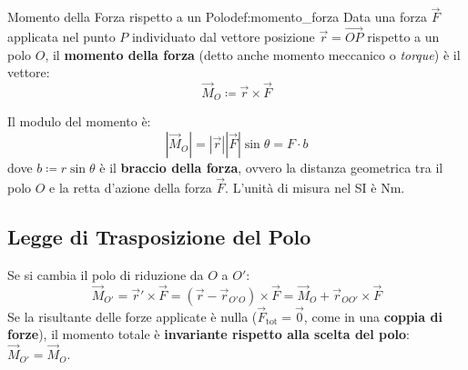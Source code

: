 \begin{definizione}{Momento della Forza rispetto a un Polo}{def:momento_forza}
Data una forza $\vec{F}$ applicata nel punto $P$ individuato dal vettore posizione $\vec{r} = \vec{OP}$ rispetto a un polo $O$, il \textbf{momento della forza} (detto anche momento meccanico o \emph{torque}) è il vettore:
\begin{equation}
    \vec{M}_O \coloneqq \vec{r} \times \vec{F}
    \label{eq:momento_forza}
\end{equation}
\end{definizione}

\begin{center}
\end{center}

Il modulo del momento è:
\begin{equation}
    |\vec{M}_O| = |\vec{r}| |\vec{F}| \sin\theta = F \cdot b
    \label{eq:modulo_momento}
\end{equation}
dove $b \coloneqq r\sin\theta$ è il \textbf{braccio della forza}, ovvero la distanza geometrica tra il polo $O$ e la retta d'azione della forza $\vec{F}$. L'unità di misura nel SI è $\si{\newton\metre}$.

\subsection{Legge di Trasposizione del Polo}
Se si cambia il polo di riduzione da $O$ a $O'$:
\begin{equation}
    \vec{M}_{O'} = \vec{r}' \times \vec{F} = (\vec{r} - \vec{r}_{O'O}) \times \vec{F} = \vec{M}_O + \vec{r}_{OO'} \times \vec{F}
    \label{eq:trasposizione_polo}
\end{equation}
Se la risultante delle forze applicate è nulla ($\vec{F}_{\text{tot}} = \vec{0}$, come in una \textbf{coppia di forze}), il momento totale è \textbf{invariante rispetto alla scelta del polo}: $\vec{M}_{O'} = \vec{M}_O$.

